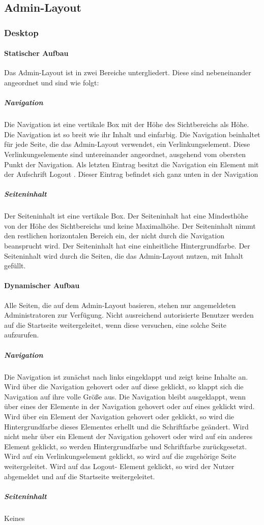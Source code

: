 \subsection{Admin-Layout}

\subsubsection{Desktop}
\paragraph*{Statischer Aufbau}
Das Admin-Layout ist in zwei Bereiche untergliedert. Diese sind nebeneinander angeordnet und sind wie folgt:

\subparagraph*{Navigation}
Die Navigation ist eine vertikale Box mit der Höhe des Sichtbereichs als Höhe.
Die Navigation ist so breit wie ihr Inhalt und einfarbig.
Die Navigation beinhaltet für jede Seite, die das Admin-Layout verwendet, ein Verlinkungselement. 
Diese Verlinkungselemente sind untereinander angeordnet, ausgehend vom obersten Punkt der Navigation.
Als letzten Eintrag besitzt die Navigation ein Element mit der Aufschrift \dq Logout \dq. Dieser Eintrag befindet sich ganz unten in der Navigation

\subparagraph*{Seiteninhalt}
Der Seiteninhalt ist eine vertikale Box. Der Seiteninhalt hat eine Mindesthöhe von der Höhe des Sichtbereichs und keine Maximalhöhe.
Der Seiteninhalt nimmt den restlichen horizontalen Bereich ein, der nicht durch die Navigation beansprucht wird.
Der Seiteninhalt hat eine einheitliche Hintergrundfarbe.
Der Seiteninhalt wird durch die Seiten, die das Admin-Layout nutzen, mit Inhalt gefüllt.

\paragraph*{Dynamischer Aufbau}
Alle Seiten, die auf dem Admin-Layout basieren, stehen nur angemeldeten Administratoren zur Verfügung. 
Nicht ausreichend autorisierte Benutzer werden auf die Startseite weitergeleitet, wenn diese versuchen, eine solche Seite aufzurufen.

\subparagraph*{Navigation}
Die Navigation ist zunächst nach links eingeklappt und zeigt keine Inhalte an. Wird über die Navigation gehovert oder auf diese geklickt,
so klappt sich die Navigation auf ihre volle Größe aus. Die Navigation bleibt ausgeklappt, wenn über eines der Elemente in der Navigation gehovert oder auf eines geklickt wird.
Wird über ein Element der Navigation gehovert oder geklickt, so wird die Hintergrundfarbe dieses Elementes erhellt und die Schriftfarbe geändert.
Wird nicht mehr über ein Element der Navigation gehovert oder wird auf ein anderes Element geklickt, so werden Hintergrundfarbe und Schriftfarbe zurückgesetzt.
Wird auf ein Verlinkungselement geklickt, so wird auf die zugehörige Seite weitergeleitet.
Wird auf das \dq Logout\dq - Element geklickt, so wird der Nutzer abgemeldet und auf die Startseite weitergeleitet.

\subparagraph*{Seiteninhalt}
Keines